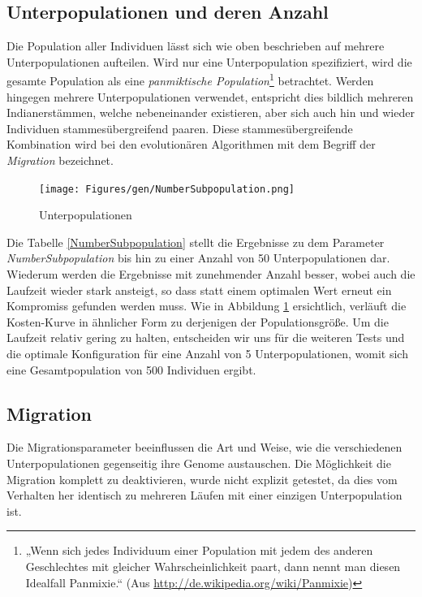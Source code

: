 \subsection{Unterpopulationen und deren Anzahl}
Die Population aller Individuen
lässt sich wie oben beschrieben auf mehrere Unterpopulationen aufteilen.
Wird nur eine Unterpopulation spezifiziert, wird die gesamte Population als
eine \emph{panmiktische Population}\footnote{„Wenn sich jedes Individuum
einer Population mit jedem des anderen Geschlechtes mit gleicher
Wahrscheinlichkeit paart, dann nennt man diesen Idealfall Panmixie.“
(Aus \url{http://de.wikipedia.org/wiki/Panmixie})} betrachtet.
Werden hingegen mehrere Unterpopulationen
verwendet, entspricht dies bildlich mehreren Indianerstämmen, welche nebeneinander
existieren, aber sich auch hin und wieder Individuen stammesübergreifend paaren.
Diese stammesübergreifende Kombination wird bei den evolutionären Algorithmen
mit dem Begriff der \emph{Migration} bezeichnet.



\begin{figure}[h!]
  \centering
  \texttt{[image: Figures/gen/NumberSubpopulation.png]}
  \caption{Unterpopulationen}\label{fig.numbersubpopulation}
\end{figure}

Die Tabelle \ref{NumberSubpopulation} stellt die Ergebnisse zu dem Parameter
\emph{NumberSubpopulation} bis hin zu einer Anzahl von 50 Unterpopulationen dar.
Wiederum werden die Ergebnisse mit zunehmender Anzahl besser, wobei auch
die Laufzeit wieder stark ansteigt, so dass statt einem optimalen Wert erneut
ein Kompromiss gefunden werden muss.
Wie in Abbildung \ref{fig.numbersubpopulation} ersichtlich, verläuft die
Kosten-Kurve in ähnlicher Form zu derjenigen der Populationsgröße. Um die
Laufzeit relativ gering zu halten, entscheiden wir uns für die weiteren Tests
und die optimale Konfiguration für eine Anzahl von 5 Unterpopulationen, womit
sich eine Gesamtpopulation von 500 Individuen ergibt.


\subsection{Migration}
Die Migrationsparameter beeinflussen die Art und Weise,
wie die verschiedenen Unterpopulationen gegenseitig ihre Genome austauschen.
Die Möglichkeit die Migration komplett zu deaktivieren, wurde nicht explizit
getestet, da dies vom Verhalten her identisch zu mehreren Läufen mit einer
einzigen Unterpopulation ist.

